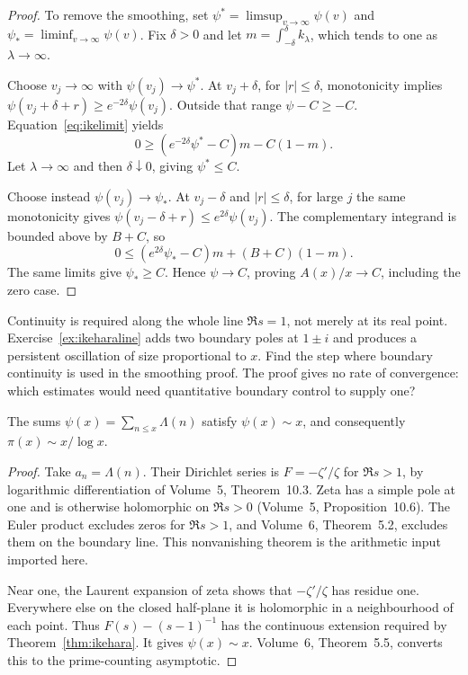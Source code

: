 \begin{proof}
To remove the smoothing, set $\psi^*=\limsup_{v\to\infty}\psi(v)$ and $\psi_*=\liminf_{v\to\infty}\psi(v)$. Fix $\delta>0$ and let $m=\int_{-\delta}^{\delta}k_\lambda$, which tends to one as $\lambda\to\infty$.

Choose $v_j\to\infty$ with $\psi(v_j)\to\psi^*$. At $v_j+\delta$, for $|r|\le\delta$, monotonicity implies $\psi(v_j+\delta+r)\ge e^{-2\delta}\psi(v_j)$. Outside that range $\psi-C\ge-C$. Equation~\eqref{eq:ikelimit} yields
\[0\ge(e^{-2\delta}\psi^*-C)m-C(1-m).
\]
Let $\lambda\to\infty$ and then $\delta\downarrow0$, giving $\psi^*\le C$.

Choose instead $\psi(v_j)\to\psi_*$. At $v_j-\delta$ and $|r|\le\delta$, for large $j$ the same monotonicity gives $\psi(v_j-\delta+r)\le e^{2\delta}\psi(v_j)$. The complementary integrand is bounded above by $B+C$, so
\[0\le(e^{2\delta}\psi_*-C)m+(B+C)(1-m).
\]
The same limits give $\psi_*\ge C$. Hence $\psi\to C$, proving $A(x)/x\to C$, including the zero case.
\end{proof}

\begin{think}
Continuity is required along the whole line $\Re s=1$, not merely at its real point. Exercise~\ref{ex:ikeharaline} adds two boundary poles at $1\pm i$ and produces a persistent oscillation of size proportional to $x$. Find the step where boundary continuity is used in the smoothing proof. The proof gives no rate of convergence: which estimates would need quantitative boundary control to supply one?
\end{think}
\begin{corollary}\label{cor:pntikehara}
The sums $\psi(x)=\sum_{n\le x}\Lambda(n)$ satisfy $\psi(x)\sim x$, and consequently $\pi(x)\sim x/\log x$.
\end{corollary}
\begin{proof}
Take $a_n=\Lambda(n)$. Their Dirichlet series is $F=-\zeta'/\zeta$ for $\Re s>1$, by logarithmic differentiation of Volume~5, Theorem~10.3. Zeta has a simple pole at one and is otherwise holomorphic on $\Re s>0$ (Volume~5, Proposition~10.6). The Euler product excludes zeros for $\Re s>1$, and Volume~6, Theorem~5.2, excludes them on the boundary line. This nonvanishing theorem is the arithmetic input imported here.

Near one, the Laurent expansion of zeta shows that $-\zeta'/\zeta$ has residue one. Everywhere else on the closed half-plane it is holomorphic in a neighbourhood of each point. Thus $F(s)-(s-1)^{-1}$ has the continuous extension required by Theorem~\ref{thm:ikehara}. It gives $\psi(x)\sim x$. Volume~6, Theorem~5.5, converts this to the prime-counting asymptotic.
\end{proof}

